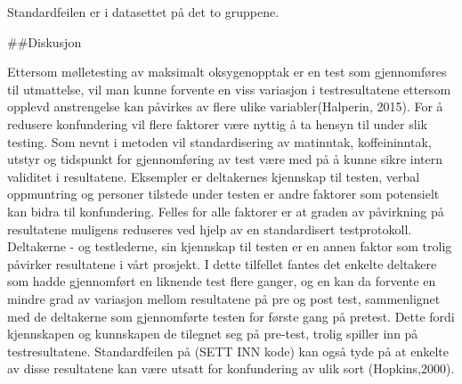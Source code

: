\documentclass[
]{article}
\begin{document}
Standardfeilen er i datasettet på det to gruppene.

\#\#Diskusjon

Ettersom mølletesting av maksimalt oksygenopptak er en test som
gjennomføres til utmattelse, vil man kunne forvente en viss variasjon i
testresultatene ettersom opplevd anstrengelse kan påvirkes av flere
ulike variabler(Halperin, 2015). For å redusere konfundering vil flere
faktorer være nyttig å ta hensyn til under slik testing. Som nevnt i
metoden vil standardisering av matinntak, koffeininntak, utstyr og
tidspunkt for gjennomføring av test være med på å kunne sikre intern
validitet i resultatene. Eksempler er deltakernes kjennskap til testen,
verbal oppmuntring og personer tilstede under testen er andre faktorer
som potensielt kan bidra til konfundering. Felles for alle faktorer er
at graden av påvirkning på resultatene muligens reduseres ved hjelp av
en standardisert testprotokoll. Deltakerne - og testlederne, sin
kjennskap til testen er en annen faktor som trolig påvirker resultatene
i vårt prosjekt. I dette tilfellet fantes det enkelte deltakere som
hadde gjennomført en liknende test flere ganger, og en kan da forvente
en mindre grad av variasjon mellom resultatene på pre og post test,
sammenlignet med de deltakerne som gjennomførte testen for første gang
på pretest. Dette fordi kjennskapen og kunnskapen de tilegnet seg på
pre-test, trolig spiller inn på testresultatene. Standardfeilen på (SETT
INN kode) kan også tyde på at enkelte av disse resultatene kan være
utsatt for konfundering av ulik sort (Hopkins,2000).
\end{document}
